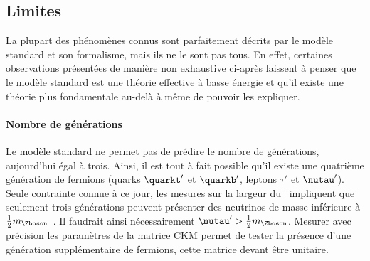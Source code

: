 \subsection{Limites}\label{chapter-MS-MSSM-section-succes_limites-subsec-limites}
La plupart des phénomènes connus sont parfaitement décrits par le modèle standard et son formalisme, mais ils ne le sont pas tous.
En effet, certaines observations présentées de manière non exhaustive ci-après laissent à penser que le modèle standard est une théorie effective à basse énergie et qu'il existe une théorie plus fondamentale au-delà à même de pouvoir les expliquer.
\paragraph{Nombre de générations}
Le modèle standard ne permet pas de prédire le nombre de générations, aujourd'hui égal à trois.
Ainsi, il est tout à fait possible qu'il existe une quatrième génération de fermions (quarks $\quarkt'$ et $\quarkb'$, leptons $\tau'$ et $\nutau'$).
Seule contrainte connue à ce jour, les mesures sur la largeur du \Zboson\ impliquent que seulement trois générations peuvent présenter des neutrinos de masse inférieure à $\frac{1}{2} m_{\Zboson}$~\cite{light_neutrino_number}.
Il faudrait ainsi nécessairement $\nutau' > \frac{1}{2} m_{\Zboson}$.
Mesurer avec précision les paramètres de la matrice CKM permet de tester la présence d'une génération supplémentaire de fermions, cette matrice devant être unitaire.
